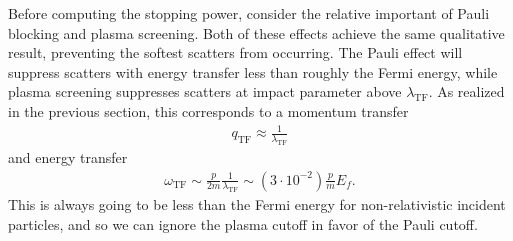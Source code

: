 \documentclass[twocolumn, preprintnumbers,amsmath,amssymb,prd, superscriptaddress]{revtex4}
\begin{document}
\begin{appendices}
Before computing the stopping power, consider the relative important of Pauli blocking and plasma screening.
Both of these effects achieve the same qualitative result, preventing the softest scatters from occurring.
The Pauli effect will suppress scatters with energy transfer less than roughly the Fermi energy, while plasma screening suppresses scatters at impact parameter above $\lambda_\text{TF}$.
As realized in the previous section, this corresponds to a momentum transfer
\begin{align}
      q_\text{TF} \approx \frac{1}{\lambda_\text{TF}}
\end{align}
and energy transfer
\begin{align}
  \label{eq:cuttoff_compare}
  \omega_\text{TF} \sim \frac{p}{2m} \frac{1}{\lambda_\text{TF}}
         \sim (3 \cdot 10^{-2}) \frac{p}{m} E_f.
\end{align}
This is always going to be less than the Fermi energy for non-relativistic incident particles, and so we can ignore the plasma cutoff in favor of the Pauli cutoff.


\end{appendices}
\end{document}
